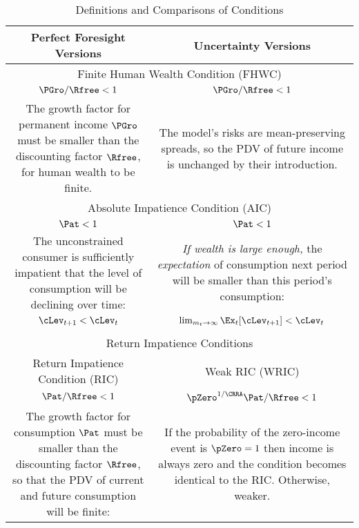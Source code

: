 \begin{table}[!th]
\caption{Definitions and Comparisons of Conditions}\label{table:Comparison}
\begin{center}
\begin{tabular}{|c|c|}\hline
Perfect Foresight Versions & Uncertainty Versions\\ \hline
\multicolumn{2}{|c|}{Finite Human Wealth Condition (FHWC)} \\ \hline
$\PGro/\Rfree < 1$                                                          & $\PGro/\Rfree < 1$ \\
\multirow{3}{75mm}{The growth factor for permanent income $\PGro$ must be smaller than the discounting factor $\Rfree$, for human wealth to be finite.} &
\multirow{3}{75mm}{The model's risks are mean-preserving spreads, so the PDV of future income is unchanged by their introduction.} \\
&  \\
&  \\ \hline
\multicolumn{2}{|c|}{Absolute Impatience Condition (AIC)} \\ \hline
$\Pat < 1$                                        &  $\Pat < 1$ \\
\multirow{4}{75mm}{The unconstrained consumer is sufficiently impatient that the level of consumption will be declining over time:} &
\multirow{4}{75mm}{\textit{If wealth is large enough,} the \textit{expectation} of consumption next period will be smaller than this period's consumption:} \\
& \\
& \\
& \\
$\cLev_{t+1} < \cLev_{t}$ & $\lim_{m_{t} \rightarrow \infty} \Ex_{t} [\cLev_{t+1}] < \cLev_{t}$ \\
& \\ \hline
\multicolumn{2}{|c|}{Return Impatience Conditions} \\ \hline
\multicolumn{1}{|c|}{Return Impatience Condition (RIC)} & \multicolumn{1}{c|}{Weak RIC (WRIC)} \\ \hline
$\Pat/\Rfree < 1$                                          & $\pZero^{1/\CRRA}\Pat/\Rfree < 1$ \\
\multirow{3}{75mm}{The growth factor for consumption $\Pat$ must be smaller than the discounting factor $\Rfree$, so that the PDV of current and future consumption will be finite:}  &
\multirow{3}{75mm}{If the probability of the zero-income event is $\pZero=1$ then income is always zero and the condition becomes identical to the RIC.  Otherwise, weaker.} \\

\end{tabular}
\end{center}
\end{table}
